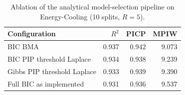\begin{table}[htbp]
\centering
\caption{Ablation of the analytical model-selection pipeline on Energy-Cooling (10 splits, $R=5$).}
\label{tab:ablation}
\scriptsize
\begin{tabular}{lrrr}
\toprule
Configuration & $R^2$ & PICP & MPIW \\
\midrule
BIC BMA & 0.937 & 0.942 & 9.073 \\
BIC PIP threshold Laplace & 0.934 & 0.938 & 9.239 \\
Gibbs PIP threshold Laplace & 0.933 & 0.939 & 9.390 \\
Full BIC as implemented & 0.931 & 0.936 & 9.537 \\
\bottomrule
\end{tabular}
\end{table}

